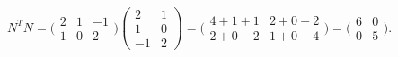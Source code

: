 \begin{solutions}
    \item $N^{T} N = \bigl(\begin{smallmatrix} 2 & 1 & -1 \\ 1 & 0 & 2 \end{smallmatrix}\bigr)\begin{pmatrix} 2 & 1 \\ 1 & 0 \\ -1 & 2 \end{pmatrix} = \bigl(\begin{smallmatrix} 4 + 1 + 1 & 2 + 0 - 2 \\ 2 + 0 - 2 & 1 + 0 + 4 \end{smallmatrix}\bigr) = \bigl(\begin{smallmatrix} 6 & 0 \\ 0 & 5 \end{smallmatrix}\bigr)$.
\end{solutions}
